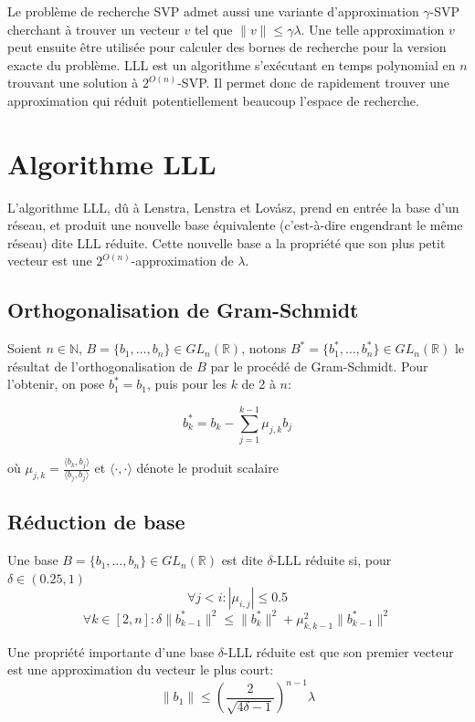 \documentclass{article}
\begin{document}
Le problème de recherche SVP admet aussi une variante d'approximation $\gamma$-SVP cherchant à trouver un vecteur $v$ tel que $\lVert v \rVert \leq \gamma \lambda$. Une telle approximation $v$ peut ensuite être utilisée pour calculer des bornes de recherche pour la version exacte du problème. LLL est un algorithme s'exécutant en temps polynomial en $n$ trouvant une solution à $2^{O(n)}$-SVP. Il permet donc de rapidement trouver une approximation qui réduit potentiellement beaucoup l'espace de recherche.

\section{Algorithme LLL}

L'algorithme LLL, dû à Lenstra, Lenstra et Lovász\cite{lll}, prend en entrée la base d'un réseau, et produit une nouvelle base équivalente (c'est-à-dire engendrant le même réseau) dite LLL réduite. Cette nouvelle base a la propriété que son plus petit vecteur est une $2^{O(n)}$-approximation de $\lambda$.

\subsection{Orthogonalisation de Gram-Schmidt}

Soient $n \in \mathbb{N}$, $B = \{ b_1, \dots, b_n\} \in GL_n(\mathbb{R})$, notons $B^* = \{ b_1^*, \dots, b_n^* \} \in GL_n(\mathbb{R})$ le résultat de l'orthogonalisation de $B$ par le procédé de Gram-Schmidt. Pour l'obtenir, on pose $b_1^* = b_1$, puis pour les $k$ de 2 à $n$:

\[ b_k^* = b_k - \sum_{j=1}^{k-1}{\mu_{j, k}b_j}\]

où $\mu_{j, k} = \frac{\langle b_k, b_j \rangle}{\langle b_j, b_j \rangle }$ et $\langle \cdot, \cdot \rangle$ dénote le produit scalaire

\subsection{Réduction de base}

Une base $B = \{ b_1, \dots, b_n\} \in GL_n(\mathbb{R})$ est dite $\delta$-LLL réduite si, pour $\delta \in (0.25, 1)$
\[ \forall j < i : |\mu_{i, j}| \leq 0.5 \]
\[ \forall k \in [2, n] : \delta \lVert b_{k-1}^*\rVert^2 \leq \lVert b_k^* \rVert^2 + \mu_{k,k-1}^2 \lVert b_{k-1}^* \rVert^2 \]

Une propriété importante d'une base $\delta$-LLL réduite est que son premier vecteur est une approximation du vecteur le plus court:
\[ \lVert b_1 \rVert \leq \left( \frac{2}{\sqrt{4\delta-1}} \right) ^{n-1} \lambda \]
\end{document}
